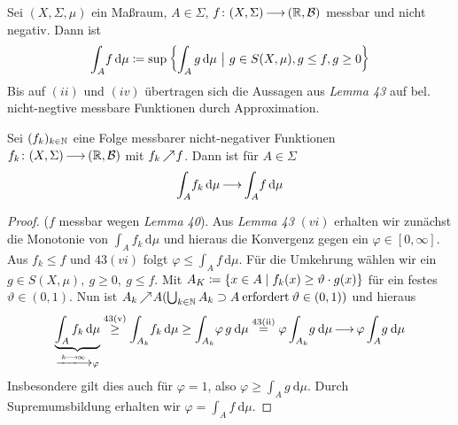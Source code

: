 \documentclass[skript.tex]{subfiles}
\begin{document}
	\begin{defin}[Integral]
		Sei $(X,\Sigma,\mu)$ ein Maßraum, $A\in\Sigma$, $f\colon(X,\Sigma)\kern -1pt \longrightarrow \kern -1pt(\mathbb{R},\mathcal{B})$ messbar und nicht negativ. Dann ist
	\begin{equation*}
		\int_{A} \! f \, \mathrm{d}\mu\coloneqq \sup \left\{\int_A g \, \mathrm{d}\mu\ \big|\ g\in S(X,\mu),g \le f, g\geq 0\right\}
	\end{equation*}
	Bis auf $(ii)$ und $(iv)$ übertragen sich die Aussagen aus \textit{Lemma 43} auf bel. nicht-negtive messbare Funktionen durch Approximation.
	\end{defin}

	\begin{theorem}
		Sei $(f_k)_{k\in\mathbb{N}}$ eine Folge messbarer nicht-negativer Funktionen $f_k\colon(X,\Sigma)\kern -1pt \longrightarrow \kern -1pt(\mathbb{R},\mathcal{B})$ mit $f_k \kern -1pt \nearrow \kern -2pt f$. Dann ist für $A\in\Sigma$
		\begin{equation*}
			\int_{A} \! f_k \, \mathrm{d}\mu \kern -1pt \longrightarrow \kern -1pt \int_{A} \! f \, \mathrm{d}\mu
		\end{equation*}
	\end{theorem}

	\begin{proof}
		($f$ messbar wegen \textit{Lemma 40}). Aus \textit{Lemma 43} $(vi)$ erhalten wir zunächst die Monotonie von $\int_{A} \! f_k \, \mathrm{d}\mu$ und hieraus die Konvergenz gegen ein $\varphi \in [0,\infty]$. Aus $f_k\leq f$ und $43(vi)$ folgt $\varphi\leq\int_{A} \! f \, \mathrm{d}\mu$. Für die Umkehrung wählen wir ein $g\in S(X,\mu), \: g\geq0, \: g\leq f$. Mit $A_K \coloneqq \{x\in A\mid f_k(x)\geq \vartheta \cdot g(x)\}$ für ein festes $\vartheta\in (0,1)$. Nun ist $A_k \kern -1pt \nearrow \kern -2pt A \\(\bigcup_{k\in\mathbb{N}}A_k \supset A \: \mathrm{erfordert} \: \vartheta\in(0,1)) $ und hieraus
		\begin{equation*}
			\underbrace{\int_A f_k \, \mathrm{d}\mu}_{\xlongrightarrow{k\lra\infty}\varphi} \stackrel{\text{43(v)}}{\geq}\int_{A_k} \! f_k \,\mathrm{d}\mu\geq\int_{A_k} \! \varphi \, g \: \mathrm{d}\mu\stackrel{\text{43(ii)}}{=}\varphi\int_{A_k} \! g \: \mathrm{d}\mu \lra \varphi\int_A \! g \: \mathrm{d}\mu
		\end{equation*}
		Insbesondere gilt dies auch für $\varphi=1$, also $\varphi\geq\int_A \! g \: \mathrm{d}\mu$. Durch Supremumsbildung erhalten wir $\varphi=\int_A \! f \: \mathrm{d}\mu$.
	\end{proof}
\end{document}
